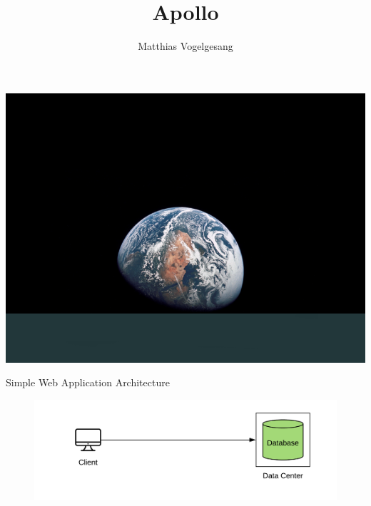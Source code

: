 \documentclass[10pt]{beamer}
\title{Apollo}
\date{}
\author{Matthias Vogelgesang}
\institute{Center for modern beamer themes}
\begin{document}
\begin{frame}{}
\vspace*{-0.2cm}
\hspace*{-1.07cm}
\includegraphics[keepaspectratio=true,width=1.03\paperwidth]{title_slide}
\end{frame}

\begin{frame}{Simple Web Application Architecture}
    \begin{figure}
        \center
        \hspace*{-1cm}
        \includegraphics[scale=0.2]{apollo_intro_arch}
    \end{figure}
\end{frame}
\end{document}
